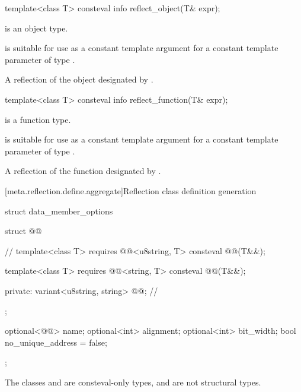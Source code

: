 %
\begin{itemdecl}
template<class T>
  consteval info reflect_object(T& expr);
\end{itemdecl}

\begin{itemdescr}
\pnum
\mandates
{} is an object type.

\pnum
\constantwhen
{} is suitable for use as a constant template argument
for a constant template parameter of type .

\pnum
\returns
A reflection of the object designated by .
\end{itemdescr}

%
\begin{itemdecl}
template<class T>
  consteval info reflect_function(T& expr);
\end{itemdecl}

\begin{itemdescr}
\pnum
\mandates
{} is a function type.

\pnum
\constantwhen
{} is suitable for use as a constant template argument
for a constant template parameter of type .

\pnum
\returns
A reflection of the function designated by .
\end{itemdescr}

[meta.reflection.define.aggregate]{Reflection class definition generation}

\begin{itemdecl}
struct data_member_options {
  struct @@ {                            // \expos
    template<class T>
      requires @@<u8string, T>
      consteval @@(T&&);

    template<class T>
      requires @@<string, T>
      consteval @@(T&&);

  private:
    variant<u8string, string> @@;         // \expos
  };

  optional<@@> name;
  optional<int> alignment;
  optional<int> bit_width;
  bool no_unique_address = false;
};
\end{itemdecl}

\begin{itemdescr}
\pnum
The classes 
and 
are consteval-only types,
and are not structural types.
\end{itemdescr}

